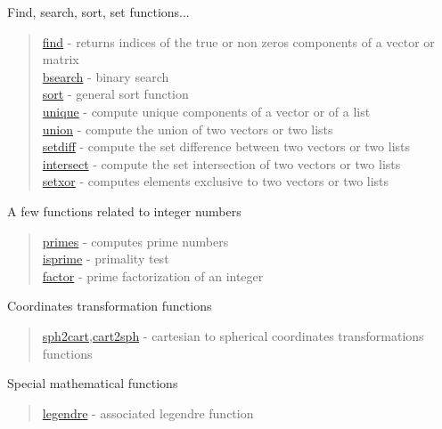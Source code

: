 Find, search, sort, set functions...

\begin{quote}
\noindent
\hyperlink{find}{find} - returns indices of the true or non zeros
components of a vector or matrix \\
\hyperlink{bsearch}{bsearch} - binary search \\
\hyperlink{sort}{sort} - general sort function \\
\hyperlink{unique}{unique} - compute unique components of a vector or of a list \\
\hyperlink{union}{union} - compute the union of two vectors or two lists \\
\hyperlink{setdiff}{setdiff} - compute the set difference between two vectors or two lists\\
\hyperlink{intersect}{intersect} - compute the set intersection of two vectors or two lists\\
\hyperlink{setxor}{setxor} - computes elements exclusive to two vectors or two lists\\
\end{quote}


A few functions related to integer numbers

\begin{quote}
\noindent
\hyperlink{primes}{primes} - computes prime numbers\\
\hyperlink{isprime}{isprime} - primality test\\
\hyperlink{factor}{factor} - prime factorization of an integer\\
\end{quote}

Coordinates transformation functions

\begin{quote}
\noindent
\hyperlink{sph2cart}{sph2cart},\hyperlink{cart2sph}{cart2sph} -
cartesian to spherical coordinates transformations functions \\
\end{quote}


Special mathematical functions

\begin{quote}
\noindent
\hyperlink{legendre}{legendre} - associated legendre function\\
\end{quote}


